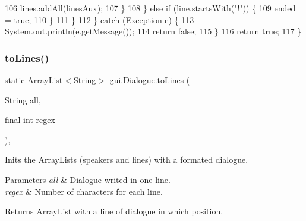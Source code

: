 \begin{DoxyCode}
106                         \mbox{\hyperlink{classgui_1_1_dialogue_a83efa9d7d08512fd59390c8ecaade1f7}{lines}}.addAll(linesAux);
107                     \}
108                 \} \textcolor{keywordflow}{else} \textcolor{keywordflow}{if} (line.startsWith(\textcolor{stringliteral}{"!"})) \{
109                     ended = \textcolor{keyword}{true};
110                 \}
111             \}
112         \} \textcolor{keywordflow}{catch} (Exception e) \{
113             System.out.println(e.getMessage());
114             \textcolor{keywordflow}{return} \textcolor{keyword}{false};
115         \}
116         \textcolor{keywordflow}{return} \textcolor{keyword}{true};
117     \}
\end{DoxyCode}
\mbox{\label{classgui_1_1_dialogue_a6460a4797c6ca33824d8e548489bf722}} 
\subsubsection{\texorpdfstring{to\+Lines()}{toLines()}}
{\footnotesize\ttfamily static Array\+List$<$String$>$ gui.\+Dialogue.\+to\+Lines (\begin{DoxyParamCaption}\item[{String}]{all,  }\item[{final int}]{regex }\end{DoxyParamCaption})\hspace{0.3cm}{\ttfamily [inline]}, {\ttfamily [static]}}

Inits the Array\+Lists (speakers and lines) with a formated dialogue.


\begin{DoxyParams}{Parameters}
{\em all} & \mbox{\hyperlink{classgui_1_1_dialogue}{Dialogue}} writed in one line. \\
\hline
{\em regex} & Number of characters for each line. \\
\hline
\end{DoxyParams}
\begin{DoxyReturn}{Returns}
Array\+List with a line of dialogue in which position. 
\end{DoxyReturn}

